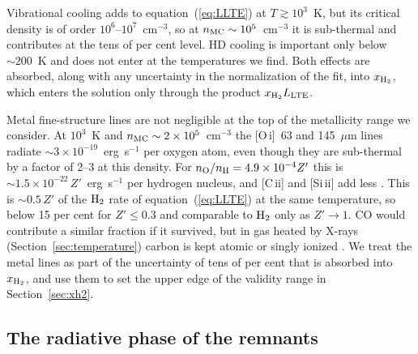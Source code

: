 \documentclass[twocolumn,pdftex]{aastex701}
\newcommand{\xhh}{x_{\rm H_2}}
\newcommand{\Zp}{Z'}
\newcommand{\Htwo}{{\rm H_2}}
\begin{document}
Vibrational cooling adds to equation~(\ref{eq:LLTE}) at $T\gtrsim10^{3}$~K, but its critical density is of order $10^{6}$--$10^{7}$~cm$^{-3}$, so at $n_{\rm MC}\sim10^{5}$~cm$^{-3}$ it is sub-thermal and contributes at the tens of per cent level. HD cooling is important only below $\sim200$~K \citep{Galli:1998a,Glover:2008a} and does not enter at the temperatures we find. Both effects are absorbed, along with any uncertainty in the normalization of the fit, into $\xhh$, which enters the solution only through the product $\xhh L_{\rm LTE}$.

Metal fine-structure lines are not negligible at the top of the metallicity range we consider. At $10^{3}$~K and $n_{\rm MC}\sim2\times10^{5}$~cm$^{-3}$ the [O\,{\sc i}]~63 and 145~$\mu$m lines radiate $\sim3\times10^{-19}$~erg~s$^{-1}$ per oxygen atom, even though they are sub-thermal by a factor of 2--3 at this density. For $n_{\rm O}/n_{\rm H} = 4.9\times10^{-4}\Zp$ this is $\sim1.5\times10^{-22}\,\Zp$~erg~s$^{-1}$ per hydrogen nucleus, and [C\,{\sc ii}] and [Si\,{\sc ii}] add less \citep{Santoro:2006a,Glover:2007a,Meijerink:2005a}. This is $\sim0.5\,\Zp$ of the $\Htwo$ rate of equation~(\ref{eq:LLTE}) at the same temperature, so below 15 per cent for $\Zp\le0.3$ and comparable to $\Htwo$ only as $\Zp\to1$. CO would contribute a similar fraction if it survived, but in gas heated by X-rays (Section~\ref{sec:temperature}) carbon is kept atomic or singly ionized \citep{Maloney:1996a}. We treat the metal lines as part of the uncertainty of tens of per cent that is absorbed into $\xhh$, and use them to set the upper edge of the validity range in Section~\ref{sec:xh2}.

\subsection{The radiative phase of the remnants}\label{sec:zeta}
\end{document}
